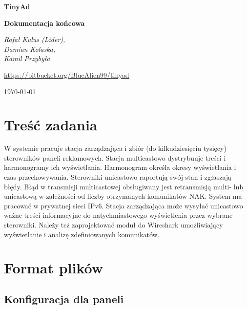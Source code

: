 \documentclass[12pt, a4paper]{article}
\begin{document}
\setlength{\parindent}{0pt}
\begin{titlepage}
    \centering
    \vspace{20cm}
    {\huge\bfseries TinyAd \unskip\strut\par}
    {\huge\bfseries Dokumentacja końcowa \unskip\strut\par}
    \vspace{1cm}
    {\Large\itshape Rafał Kulus (Lider), \\Damian Kolaska, \\Kamil Przybyła \unskip\strut\par}
    \vspace{1cm}
    \href{https://bitbucket.org/BlueAlien99/tinyad}{https://bitbucket.org/BlueAlien99/tinyad}

    \vfill
    
    {\large \today\par}
\end{titlepage}
\tableofcontents
\clearpage

\hypertarget{treux15bux107-zadania}{%
\section{Treść zadania}\label{treux15bux107-zadania}}

W systemie pracuje stacja zarządzająca i zbiór (do kilkudziesięciu
tysięcy) sterowników paneli reklamowych. Stacja multicastowo dystrybuuje
treści i harmonogramy ich wyświetlania. Harmonogram określa okresy
wyświetlania i czas przechowywania. Sterowniki unicastowo raportują swój
stan i zgłaszają błędy. Błąd w transmisji multicastowej obsługiwany jest
retransmisją multi- lub unicastową w zależności od liczby otrzymanych
komunikatów NAK. System ma pracować w prywatnej sieci IPv6. Stacja
zarządzająca może wysyłać unicastowo ważne treści informacyjne do
natychmiastowego wyświetlenia przez wybrane sterowniki. Należy też
zaprojektować moduł do Wireshark umożliwiający wyświetlanie i analizę
zdefiniowanych komunikatów.

\hypertarget{format-plikuxf3w}{%
\section{Format plików}\label{format-plikuxf3w}}

\hypertarget{konfiguracja-dla-paneli}{%
\subsection{Konfiguracja dla paneli}\label{konfiguracja-dla-paneli}}
\end{document}
